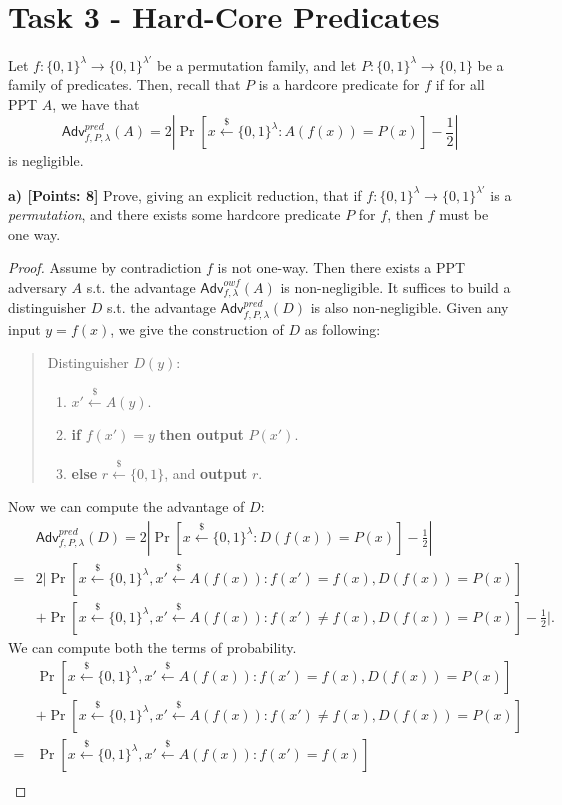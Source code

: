 \documentclass[12pt]{article}
\newcommand{\bits}{\{0,1\}}
\newcommand{\getsr}{\stackrel{\$}{\gets}}
\newcommand{\Adv}{\textsf{Adv}}
\theoremstyle{definition}
\begin{document}
\section{Task 3 - Hard-Core Predicates}
Let $f : \bits^\lambda \to \bits^{\lambda'}$ be a permutation family, and let $P : \bits^\lambda \to \bits$ be a family of predicates. Then, recall that $P$ is a hardcore predicate for $f$ if for all PPT $A$, we have that
$$\Adv_{f,P,\lambda}^{pred}(A) = 2 \left| \Pr[x\getsr\bits^\lambda : A(f(x)) = P(x)] -\frac{1}{2}\right|$$
is negligible.

{\bf a) [Points: 8]} Prove, giving an explicit reduction, that if $f : \bits^\lambda \to \bits^{\lambda'}$ is a \emph{permutation}, and there exists some hardcore predicate $P$ for $f$, then $f$ must be one way.
\begin{proof}
Assume by contradiction $f$ is not one-way. Then there exists a PPT adversary $A$ s.t. the advantage $\Adv_{f,\lambda}^{owf}(A)$ is non-negligible. It suffices to build a distinguisher $D$ s.t. the advantage $\Adv_{f,P,\lambda}^{pred}(D)$ is also non-negligible. Given any input $y=f(x)$, we give the construction of $D$ as following:
\begin{quote}
Distinguisher $D(y)$:
\begin{enumerate}
\item $x' \getsr A(y)$.
\item {\bf if} $f(x') = y$ {\bf then output} $P(x')$.
\item {\bf else} $r\getsr\bits$, and {\bf output} $r$. 
\end{enumerate}
\end{quote}
Now we can compute the advantage of $D$:
$$
\begin{aligned}
&\Adv_{f,P,\lambda}^{pred}(D) = 2 \left| \Pr[x\getsr\bits^\lambda : D(f(x)) = P(x)] -\frac{1}{2}\right| \\
=& 2 \bigg| \Pr[x\getsr\bits^\lambda, x'\getsr A(f(x)) : f(x')=f(x), D(f(x)) = P(x)] \\
&+ \Pr[x\getsr\bits^\lambda, x'\getsr A(f(x)) : f(x')\not=f(x), D(f(x)) = P(x)] -\frac{1}{2}\bigg|.
\end{aligned}
$$
We can compute both the terms of probability.
$$
\begin{aligned}
&\Pr[x\getsr\bits^\lambda, x'\getsr A(f(x)) : f(x')=f(x), D(f(x)) = P(x)] \\
&+\Pr[x\getsr\bits^\lambda, x'\getsr A(f(x)) : f(x')\not=f(x), D(f(x)) = P(x)] \\
=&\Pr[x\getsr\bits^\lambda, x'\getsr A(f(x)) : f(x')=f(x)]\\

\end{aligned}$$
\end{proof}
\end{document}
